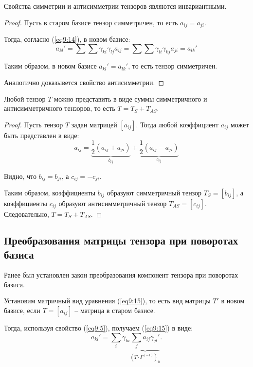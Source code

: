 	\begin{theorem}
	Свойства симметрии и антисимметрии тензоров являются инвариантными.
	\end{theorem}
	
	\begin{proof}
	
	Пусть в старом базисе тензор симметричен, то есть \( a_{ij} = a_{ji} \).
	
	Тогда, согласно (\ref{eq9:14}), в новом базисе:
	\[ a_{kl}' = \sum\sum \gamma_{ki}\gamma_{lj} a_{ij} = \sum\sum \gamma_{li}\gamma_{kj} a_{ji} = a_{lk}' \]
	
	Таким образом, в новом базисе \( a_{kl}' = a_{lk}' \), то есть тензор симметричен.
	
	Аналогично доказывется свойство антисимметрии. 
	\end{proof}
	
	\begin{theorem}
	Любой тензор \( T \) можно представить в виде суммы симметричного и антисимметричного тензоров, то есть \( T = T_S + T_{AS} \).
	\end{theorem}
	
	\begin{proof}
	
	Пусть тензор \( T \) задан матрицей \( [a_{ij}] \). Тогда любой коэффициент \( a_{ij} \) может быть представлен в виде:
	\[ a_{ij} = \underbrace{\frac{1}{2} (a_{ij} + a_{ji})}_{b_{ij}} + \underbrace{\frac{1}{2} (a_{ij} - a_{ji})}_{c_{ij}} \]
	
	Видно, что \( b_{ij} = b_{ji} \), а \( c_{ij} = -c_{ji} \).
	
	Таким образом, коэффициенты \( b_{ij} \) образуют симметричный тензор \( T_S = [b_{ij}] \), а коэффициенты \( c_{ij} \) образуют антисимметричный тензор \( T_{AS} = [c_{ij}] \). Следовательно, \( T = T_S + T_{AS} \).
	\end{proof}
	
\subsection{Преобразования матрицы тензора при поворотах базиса}

	Ранее был установлен закон преобразования компонент тензора при поворотах базиса.
	
	Установим матричный вид уравнения (\ref{eq9:15}), то есть вид матрицы \( T' \) в новом базисе, если \( T = [a_{ij}] \) -- матрица в старом базисе.
	
	Тогда, используя свойство (\ref{eq9:5}), получаем (\ref{eq9:15}) в виде:
	\[ a_{kl}' = \sum\limits_i \gamma_{ki} \underbrace{\sum\limits_j a_{ij} \gamma_{jl}'}_{( T\cdot\Gamma^{(-1)} )_{il}}. \]
	
